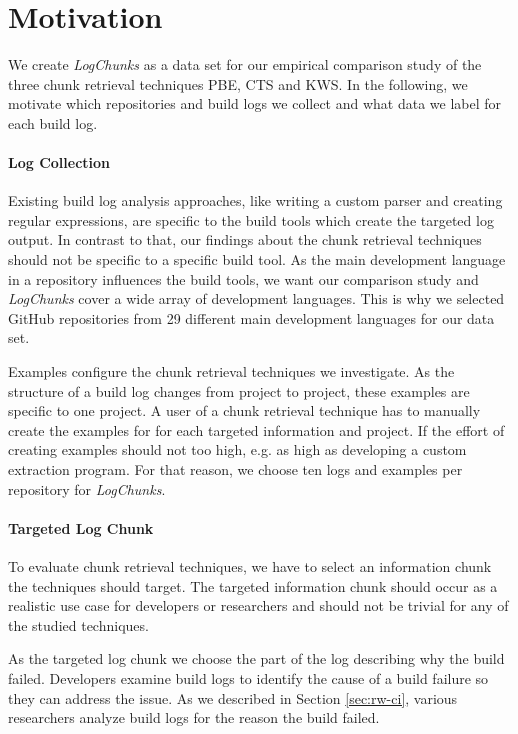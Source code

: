 \documentclass[\myrootdir/main.tex]{subfiles}
\begin{document}
\section{Motivation}
We create \emph{LogChunks} as a data set for our empirical comparison study of the three chunk retrieval techniques PBE, CTS and KWS\@.
In the following, we motivate which repositories and build logs we collect and what data we label for each build log.

\paragraph{Log Collection}
Existing build log analysis approaches, like writing a custom parser and creating regular expressions, are specific to the build tools which create the targeted log output.
In contrast to that, our findings about the chunk retrieval techniques should not be specific to a specific build tool.
As the main development language in a repository influences the build tools, we want our comparison study and \emph{LogChunks} cover a wide array of development languages.
This is why we selected GitHub repositories from 29 different main development languages for our data set.

Examples configure the chunk retrieval techniques we investigate.
As the structure of a build log changes from project to project, these examples are specific to one project.
A user of a chunk retrieval technique has to manually create the examples for for each targeted information and project.
If the effort of creating examples should not too high, e.g. as high as developing a custom extraction program.
For that reason, we choose ten logs and examples per repository for \emph{LogChunks}.

\paragraph{Targeted Log Chunk}
To evaluate chunk retrieval techniques, we have to select an information chunk the techniques should target.
The targeted information chunk should occur as a realistic use case for developers or researchers and should not be trivial for any of the studied techniques.

As the targeted log chunk we choose the part of the log describing why the build failed.
Developers examine build logs to identify the cause of a build failure so they can address the issue.
As we described in Section \ref{sec:rw-ci}, various researchers analyze build logs for the reason the build failed.
\end{document}
